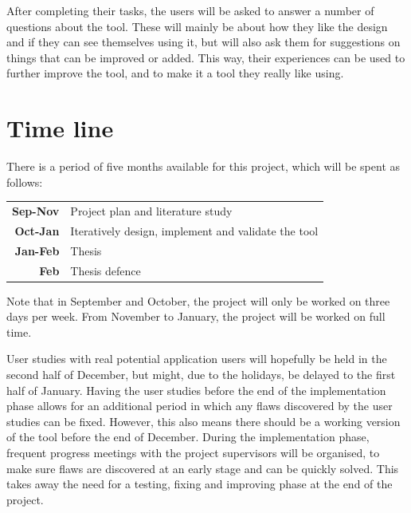 After completing their tasks, the users will be asked to answer a number of questions about the tool. These will mainly be about how they like the design and if they can see themselves using it, but will also ask them for suggestions on things that can be improved or added. This way, their experiences can be used to further improve the tool, and to make it a tool they really like using.


\section{Time line}

There is a period of five months available for this project, which will be spent as follows:

\noindent
\begin{tabular}{r|l}
\textbf{Sep-Nov} & Project plan and literature study\\
\textbf{Oct-Jan} & Iteratively design, implement and validate the tool\\
\textbf{Jan-Feb} & Thesis\\
\textbf{Feb} & Thesis defence
\end{tabular}

\noindent
Note that in September and October, the project will only be worked on three days per week. From November to January, the project will be worked on full time.

User studies with real potential application users will hopefully be held in the second half of December, but might, due to the holidays, be delayed to the first half of January. Having the user studies before the end of the implementation phase allows for an additional period in which any flaws discovered by the user studies can be fixed. However, this also means there should be a working version of the tool before the end of December. During the implementation phase, frequent progress meetings with the project supervisors will be organised, to make sure flaws are discovered at an early stage and can be quickly solved. This takes away the need for a testing, fixing and improving phase at the end of the project.
